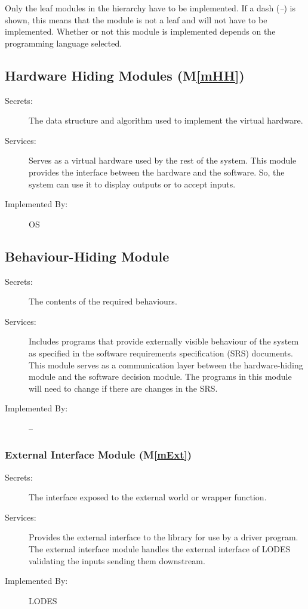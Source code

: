 \documentclass[12pt, titlepage]{article}
\newcommand{\mref}[1]{M\ref{#1}}
\begin{document}
Only the leaf modules in the
hierarchy have to be implemented. If a dash (\emph{--}) is shown, this means
that the module is not a leaf and will not have to be implemented. Whether or
not this module is implemented depends on the programming language
selected.

\subsection{Hardware Hiding Modules (\mref{mHH})}

\begin{description}
\item[Secrets:]The data structure and algorithm used to implement the virtual
  hardware.
\item[Services:]Serves as a virtual hardware used by the rest of the
  system. This module provides the interface between the hardware and the
  software. So, the system can use it to display outputs or to accept inputs.
\item[Implemented By:] OS
\end{description}

\subsection{Behaviour-Hiding Module}

\begin{description}
\item[Secrets:]The contents of the required behaviours.
\item[Services:]Includes programs that provide externally visible behaviour of
  the system as specified in the software requirements specification (SRS)
  documents. This module serves as a communication layer between the
  hardware-hiding module and the software decision module. The programs in this
  module will need to change if there are changes in the SRS.
\item[Implemented By:] --
\end{description}

\subsubsection{External Interface Module (\mref{mExt})}

\begin{description}
\item[Secrets:]The interface exposed to the external world or wrapper function.
\item[Services:]Provides the external interface to the library for use by a driver program.
The external interface module handles the external interface of LODES validating the inputs
sending them downstream.
\item[Implemented By:] LODES
\end{description}
\end{document}
